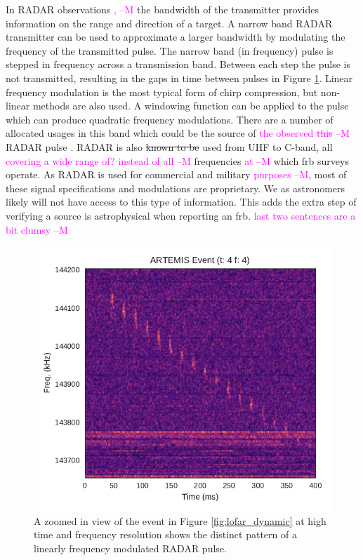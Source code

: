 \documentclass[a4paper,fleqn,usenatbib]{mnras}
\newcommand{\cM}[1]{\textcolor{magenta}{ #1 --M}}
\begin{document}
In RADAR observations\cM{,} the bandwidth of the transmitter provides information on
the range and direction of a target. A narrow band RADAR transmitter can be used
to approximate a larger bandwidth by modulating the frequency of the transmitted
pulse. The narrow band (in frequency) pulse is stepped in frequency across a
transmission band. Between each step the pulse is not transmitted, resulting in
the gaps in time between pulses in Figure \ref{fig:lofar_dynamic_high}. Linear
frequency modulation is the most typical form of chirp compression, but
non-linear methods are also used. A windowing function can be applied to the
pulse which can produce quadratic frequency modulations.  There are a number of
allocated usages in this band which could be the source of \cM{the observed \sout{this}} RADAR pulse
\citep{ofcom2017}. RADAR is also \sout{known to be} used from UHF to C-band, all \cM{covering a wide range of? instead of all}
frequencies \cM{at} which \gls{frb} surveys operate. As RADAR is used for commercial and
military \cM{purposes}, most of these signal specifications and modulations are proprietary.
We as astronomers likely will not have access to this type of information.  This
adds the extra step of verifying a source is astrophysical when reporting an
\gls{frb}. \cM{last two sentences are a bit clumsy}

\begin{figure}
    \includegraphics[width=1.0\linewidth]{figures/LOFAR_dynamic_high_res.pdf}
    \caption{A zoomed in view of the event in Figure \ref{fig:lofar_dynamic} at
    high time and frequency resolution shows the distinct pattern of a linearly frequency
    modulated RADAR pulse.
    }
    \label{fig:lofar_dynamic_high}
\end{figure}
\end{document}
